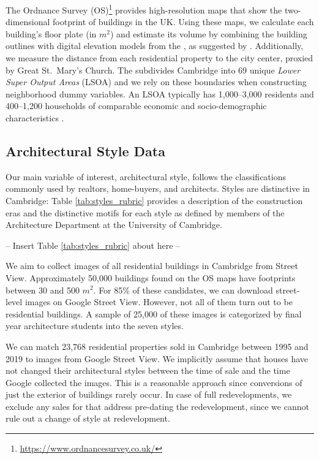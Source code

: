 \documentclass[]{article}
\begin{document}
The Ordnance Survey (OS)\footnote{\url{https://www.ordnancesurvey.co.uk/}} provides high-resolution maps that show the two-dimensional footprint of buildings in the UK. Using these maps, we calculate each building's floor plate (in \(m^2\)) and estimate its volume by combining the building outlines with digital elevation models from the \textcite{EnvironmentAgency2015}, as suggested by \textcite{Lindenthal2017}. Additionally, we measure the distance from each residential property to the city center, proxied by Great St.~Mary's Church. The \textcite{ONS2017} subdivides Cambridge into 69 unique \emph{Lower Super Output Areas} (LSOA) and we rely on these boundaries when constructing neighborhood dummy variables. An LSOA typically has 1,000--3,000 residents and 400--1,200 households of comparable economic and socio-demographic characteristics \autocite{ONS2017b}. 


\hypertarget{ml-classification-of-building-styles}{%
\subsection{Architectural Style Data}\label{ml-classification-of-building-styles}}

Our main variable of interest, architectural style, follows the classifications commonly used by realtors, home-buyers, and architects. Styles are distinctive in Cambridge: Table \ref{tab:styles_rubric} provides a description of the construction eras and the distinctive motifs for each style as defined by members of the Architecture Department at the University of Cambridge. 

\begin{center}
  -- Insert Table \ref{tab:styles_rubric} about here --
\end{center}

We aim to collect images of all residential buildings in Cambridge from Street View. Approximately 50,000 buildings found on the OS maps have footprints between 30 and 500 $m^2$. For 85\% of these candidates, we can download street-level images on Google Street View. However, not all of them turn out to be residential buildings. A sample of 25,000 of these images is categorized by final year architecture students into the seven styles. 

 We can match 23,768 residential properties sold in Cambridge between 1995 and 2019 to images from Google Street View. We implicitly assume that houses have not changed their architectural styles between the time of sale and the time Google collected the images. This is a reasonable approach since conversions of just the exterior of buildings rarely occur. In case of full redevelopments, we exclude any sales for that address pre-dating the redevelopment, since we cannot rule out a change of style at redevelopment.
 
\end{document}

